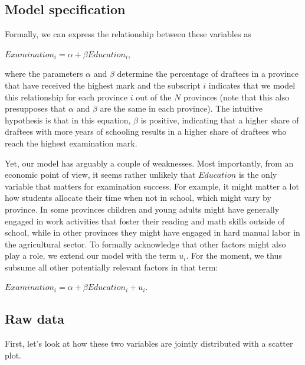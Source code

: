 \documentclass[
  12pt,
]{style/krantz}
\newenvironment{Shaded}{\begin{snugshade}}{\end{snugshade}}
\newcommand{\FunctionTok}[1]{\textcolor[rgb]{0.00,0.00,0.00}{#1}}
\newcommand{\NormalTok}[1]{#1}
\newcommand{\SpecialCharTok}[1]{\textcolor[rgb]{0.00,0.00,0.00}{#1}}
\begin{document}
\hypertarget{model-specification}{%
\subsection{Model specification}\label{model-specification}}

Formally, we can express the relationship between these variables as

\(Examination_{i}= \alpha + \beta Education_{i}\),

where the parameters \(\alpha\) and \(\beta\) determine the percentage of draftees in a province that have received the highest mark and the subscript \(i\) indicates that we model this relationship for each province \(i\) out of the \(N\) provinces (note that this also presupposes that \(\alpha\) and \(\beta\) are the same in each province). The intuitive hypothesis is that in this equation, \(\beta\) is positive, indicating that a higher share of draftees with more years of schooling results in a higher share of draftees who reach the highest examination mark.

Yet, our model has arguably a couple of weaknesses. Most importantly, from an economic point of view, it seems rather unlikely that \(Education\) is the only variable that matters for examination success. For example, it might matter a lot how students allocate their time when not in school, which might vary by province. In some provinces children and young adults might have generally engaged in work activities that foster their reading and math skills outside of school, while in other provinces they might have engaged in hard manual labor in the agricultural sector. To formally acknowledge that other factors might also play a role, we extend our model with the term \(u_{i}\). For the moment, we thus subsume all other potentially relevant factors in that term:

\(Examination_{i}= \alpha + \beta Education_{i} + u_{i}\).

\hypertarget{raw-data}{%
\subsection{Raw data}\label{raw-data}}

First, let's look at how these two variables are jointly distributed with a scatter plot.

\begin{Shaded}
\end{Shaded}
\end{document}
